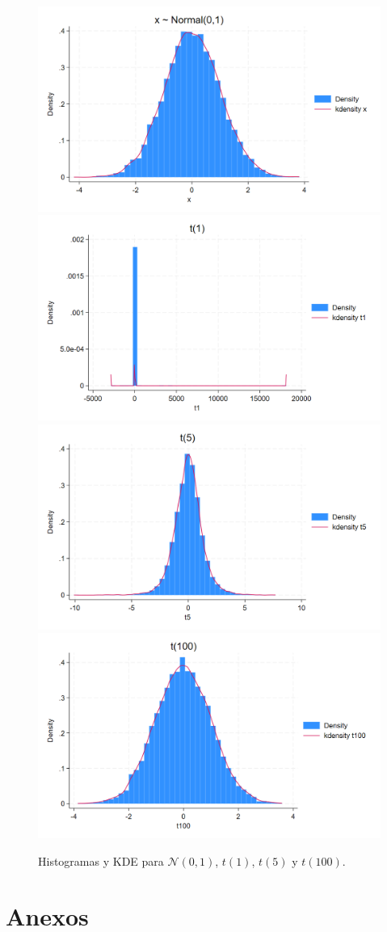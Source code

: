 \documentclass[12pt]{article}
\begin{document}
\begin{itemize}
    \begin{figure}[h!]
    \centering
    \includegraphics[width=.48\textwidth]{Figures/0111-N001.png}\hfill
    \includegraphics[width=.48\textwidth]{Figures/0111-t001.png}\\[0.4em]
    \includegraphics[width=.48\textwidth]{Figures/0111-t005.png}\hfill
    \includegraphics[width=.48\textwidth]{Figures/0111-t100.png}
    \caption{Histogramas y KDE para \(\mathcal N(0,1)\), \(t(1)\), \(t(5)\) y \(t(100)\).}
    \label{fig:hists}
    \end{figure}

    
\end{itemize}

\appendix
\clearpage
\section*{\centering \Huge Anexos}
\end{document}
